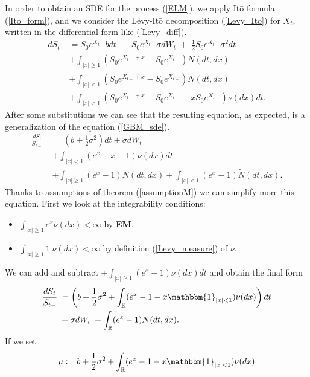 In order to obtain an SDE for the process (\ref{ELM}), we apply It\={o} formula (\ref{Ito_form}), and we consider 
the Lévy-It\={o} decomposition (\ref{Levy_Ito}) for $X_t$, written in the differential form like (\ref{Levy_diff}).
\begin{align*}
 d S_t \; &= S_0 e^{X_{t-}} b dt \; + \; S_0 e^{X_{t-}} \sigma dW_t \; + \; \frac{1}{2}S_0 e^{X_{t-}}\sigma^2 dt \\ \nonumber
          &+ \int_{|x|\geq 1} (S_0 e^{X_{t-}+x} - S_0 e^{X_{t-}}) N(dt,dx) \\ \nonumber
          &+ \int_{|x|< 1} (S_0 e^{X_{t-}+x} - S_0 e^{X_{t-}}) \tilde N(dt,dx) \\  \nonumber
          &+ \int_{|x|< 1} (S_0 e^{X_{t-}+x} - S_0 e^{X_{t-}} - x S_0 e^{X_{t-}}) \nu(dx) dt. \nonumber
\end{align*}
After some substitutions we can see that the resulting equation, as expected, is a generalization of the equation (\ref{GBM_sde}).
\begin{align}
 \frac{d S_t}{S_{t-}}  \; &= (b + \frac{1}{2}\sigma^2 ) dt + \sigma dW_t \\ \nonumber
                          &+ \int_{|x|< 1} ( e^{x} - x - 1) \nu(dx) dt \\ \nonumber
                          &+ \int_{|x|\geq 1} (e^{x} - 1) N(dt,dx) + \int_{|x|< 1} (e^{x} - 1) \tilde N(dt,dx). \nonumber
\end{align}
Thanks to assumptions of theorem (\ref{assumptionM}) we can simplify more this equation.
First we look at the integrability conditions:
\begin{itemize}
 \item $\int_{|x|\geq 1}  e^{x} \nu(dx) < \infty$ by \textbf{EM}.  
 \item $\int_{|x|\geq 1} 1\; \nu(dx) < \infty$ by definition (\ref{Levy_measure}) of $\nu$.
\end{itemize}
We can add and subtract $\pm \int_{|x|\geq 1} ( e^{x} - 1) \nu(dx) dt $ and obtain the final form
\begin{align} \label{exp_sde}
 \frac{d S_t}{S_{t-}}  \; &= \left(b + \frac{1}{2}\sigma^2 + \int_{\R} ( e^{x} - 1 -x\mathbbm{1}_{|x|<1}) \nu(dx) \right) dt  \\ \nonumber
                          &+  \sigma dW_t \; + \int_{\R} (e^{x} - 1) \tilde N(dt,dx). \nonumber
\end{align}
If we set
\begin{equation}\label{mu}
 \mu := b + \frac{1}{2}\sigma^2 + \int_{\R} ( e^{x} - 1 -x\mathbbm{1}_{|x|<1}) \nu(dx)
\end{equation}
